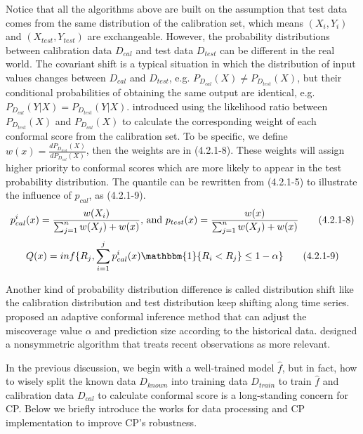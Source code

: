Notice that all the algorithms above are built on the assumption that test data comes from the same distribution of the calibration set, which means $(X_i, Y_i)$ and $(X_{test}, Y_{test})$ are exchangeable. However, the probability distributions between calibration data $D_{cal}$ and test data $D_{test}$ can be different in the real world. The covariant shift is a typical situation in which the distribution of input values changes between $D_{cal}$ and $D_{test}$, e.g. $P_{D_{cal}}(X)\neq P_{D_{test}}(X)$, but their conditional probabilities of obtaining the same output are identical, e.g. $P_{D_{cal}}(Y|X) = P_{D_{test}}(Y|X)$.  \cite{tibshirani2019conformal} introduced using the likelihood ratio between $P_{D_{test}}(X)$ and $P_{D_{cal}}(X)$ to calculate the corresponding weight of each conformal score from the calibration set. To be specific, we define $w(x)=\frac{dP_{D_{test}}(X)}{dP_{D_{cal}}(X)}$, then the weights are in (4.2.1-8). These weights will assign higher priority to conformal scores which are more likely to appear in the test probability distribution. The quantile can be rewritten from (4.2.1-5) to illustrate the influence of $p_{cal}$, as (4.2.1-9).
\begin{equation}
p_{cal}^i(x)=\frac{w(X_i)}{\sum_{j=1}^n w(X_j)+w(x)}\text{, and } p_{test}(x)=\frac{w(x)}{\sum_{j=1}^n w(X_j)+w(x)}\\\tag{4.2.1-8}
\end{equation}
\begin{equation}
Q(x) = inf\{R_j,\sum_{i=1}^j p_{cal}^i(x)\mathbbm{1}\{R_i<R_j\}\leq 1-\alpha \}\\\tag{4.2.1-9}
\end{equation}

Another kind of probability distribution difference is called distribution shift like the calibration distribution and test distribution keep shifting along time series. \cite{zargarbashi2023conformal} proposed an adaptive conformal inference method that can adjust the miscoverage value $\alpha$ and prediction size according to the historical data.\cite{Barber2022ConformalPB} designed a nonsymmetric algorithm that treats recent observations as more relevant.

In the previous discussion, we begin with a well-trained model $\hat{f}$, but in fact, how to wisely split the known data $D_{known}$ into training data $D_{train}$ to train $\hat{f}$ and calibration data $D_{cal}$ to calculate conformal score is a long-standing concern for CP. Below we briefly introduce the works for data processing and CP implementation to improve CP's robustness. 

